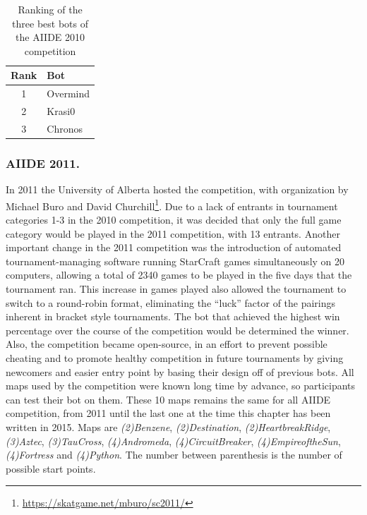 \documentclass{llncs}
\begin{document}
\begin{table}[!t]
\caption{Ranking of the three best bots of the AIIDE 2010 competition}
\label{tab:aiide2010}
\centering
\begin{tabular}{|c|l|}
\hline
{\bfseries Rank} & {\bfseries Bot}\\
\hline
1 & Overmind \\
2 & Krasi0 \\
3 & Chronos \\
\hline
\end{tabular}
\end{table}

\subsubsection{AIIDE 2011.}

In 2011 the University of Alberta hosted the competition, with organization by Michael Buro and
David Churchill\footnote{\url{https://skatgame.net/mburo/sc2011/}}. Due to a lack of entrants in tournament categories 1-3 in the 2010 competition, it was
decided that only  the full game category would be  played in the 2011
competition, with 13 entrants. Another important
change in the 2011 competition was the introduction of automated tournament-managing software running
StarCraft games simultaneously on 20 computers, allowing a total of 2340 games to be played in the five days that the tournament ran. 
This increase in games played also allowed the tournament
to switch to a round-robin format, eliminating the ``luck'' factor of the pairings inherent in bracket
style tournaments. The bot that achieved the highest win percentage over the course of the competition would
be determined the winner. Also, the competition became open-source, in an effort 
to prevent possible cheating and to promote healthy competition in future tournaments by giving
newcomers  and  easier entry  point  by  basing  their design  off  of
previous bots. All  maps used by the competition were  known long time
by advance, so participants can test their bot on them.  These 10 maps
remains the same for all AIIDE  competition, from 2011 until the last
one  at the  time this  chapter  has been  written in  2015. Maps  are
\emph{(2)Benzene},    \emph{(2)Destination}, \emph{(2)HeartbreakRidge},  \emph{(3)Aztec},  \emph{(3)TauCross},  \emph{(4)Andromeda},
\emph{(4)CircuitBreaker}, \emph{(4)EmpireoftheSun}, \emph{(4)Fortress}
and \emph{(4)Python}. The number between  parenthesis is the number of
possible start points.
\end{document}
